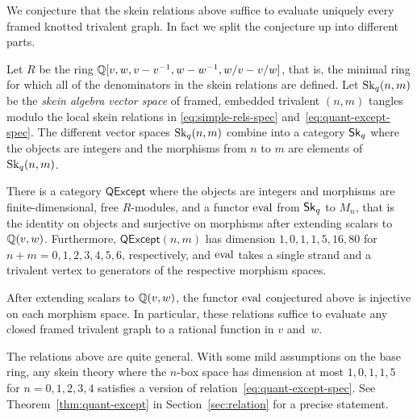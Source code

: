 \documentclass[12pt]{amsart}
\begin{document}
We conjecture that the skein relations above suffice to evaluate
uniquely every framed knotted trivalent graph. In fact we split the
conjecture up into different parts.

Let $R$ be the ring $\mathbb Q[v,w,v - v^{-1},w - w^{-1}, w/v - v/w]$, that
is, the minimal ring for which all of the denominators in the skein
relations are defined. Let $\mathop{\mathrm{Sk}_q}(n,m)$ be the \emph{skein algebra vector space}
of framed, embedded trivalent $(n,m)$ tangles modulo the
local skein relations in \eqref{eq:simple-rels-spec}
and~\eqref{eq:quant-except-spec}. The different vector spaces
$\mathop{\mathrm{Sk}_q}(n,m)$ combine into a category $\mathop{\mathsf{Sk}_q}$ where the objects are
integers and the morphisms from $n$ to $m$ are elements of $\mathop{\mathrm{Sk}_q}(n,m)$.

\begin{conjecture}
  \label{conj:quant-consist}
  There is a category $\mathsf{QExcept}$ where the objects are
  integers and morphisms are finite-dimensional, free $R$-modules, and
  a functor $\operatorname{eval}$ from $\mathop{\mathsf{Sk}_q}$ to $M_n$, that is the identity on
  objects and surjective on morphisms after extending scalars to
  $\mathbb Q(v,w)$. Furthermore, $\mathsf{QExcept}(n,m)$ has dimension
  $1,\allowbreak0,\allowbreak1,\allowbreak1,\allowbreak5,\allowbreak16,\allowbreak80$
  for $n+m=0,1,2,3,4,5,6$, respectively, and $\operatorname{eval}$ takes a single
  strand and a trivalent vertex to generators of the respective
  morphism spaces.
\end{conjecture}

\begin{conjecture}
  \label{conj:quant-suffic}
  After extending scalars to $\mathbb Q(v,w)$, the functor $\operatorname{eval}$
  conjectured above is injective on each morphism space. In
  particular, these relations suffice to evaluate any closed framed
  trivalent graph to a rational function in $v$ and~$w$.
\end{conjecture}

  The relations above are quite general. With some mild assumptions on
  the base ring, any skein theory where the $n$-box space has
  dimension at most $1,0,1,1,5$ for $n=0,1,2,3,4$ satisfies a version
  of relation~\eqref{eq:quant-except-spec}. See
  Theorem~\ref{thm:quant-except} in Section~\ref{sec:relation} for a
  precise statement.
\end{document}
